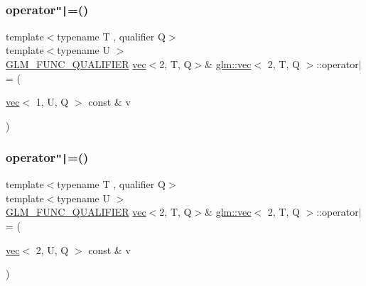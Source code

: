 \mbox{\label{structglm_1_1vec_3_012_00_01_t_00_01_q_01_4_ae4060ed77226e8669a00d6511f61eab3}} 
\subsubsection{\texorpdfstring{operator\texttt{"|}=()}{operator|=()}\hspace{0.1cm}{\footnotesize\ttfamily [5/6]}}
{\footnotesize\ttfamily template$<$typename T , qualifier Q$>$ \\
template$<$typename U $>$ \\
\hyperlink{setup_8hpp_a33fdea6f91c5f834105f7415e2a64407}{G\+L\+M\+\_\+\+F\+U\+N\+C\+\_\+\+Q\+U\+A\+L\+I\+F\+I\+ER} \hyperlink{structglm_1_1vec}{vec}$<$2, T, Q$>$\& \hyperlink{structglm_1_1vec}{glm\+::vec}$<$ 2, T, Q $>$\+::operator$\vert$= (\begin{DoxyParamCaption}\item[{\hyperlink{structglm_1_1vec}{vec}$<$ 1, U, Q $>$ const \&}]{v }\end{DoxyParamCaption})}

\mbox{\label{structglm_1_1vec_3_012_00_01_t_00_01_q_01_4_a7c1e10ca06c86243f4ad6ceb094e7bdc}} 
\subsubsection{\texorpdfstring{operator\texttt{"|}=()}{operator|=()}\hspace{0.1cm}{\footnotesize\ttfamily [6/6]}}
{\footnotesize\ttfamily template$<$typename T , qualifier Q$>$ \\
template$<$typename U $>$ \\
\hyperlink{setup_8hpp_a33fdea6f91c5f834105f7415e2a64407}{G\+L\+M\+\_\+\+F\+U\+N\+C\+\_\+\+Q\+U\+A\+L\+I\+F\+I\+ER} \hyperlink{structglm_1_1vec}{vec}$<$2, T, Q$>$\& \hyperlink{structglm_1_1vec}{glm\+::vec}$<$ 2, T, Q $>$\+::operator$\vert$= (\begin{DoxyParamCaption}\item[{\hyperlink{structglm_1_1vec}{vec}$<$ 2, U, Q $>$ const \&}]{v }\end{DoxyParamCaption})}



